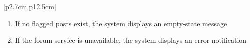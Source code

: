 \begin{table}[H]
\begin{tabular}{|p{2.7cm}|p{12.5cm}|}
\begin{minipage}[t]{\linewidth}
                                      \begin{enumerate}[topsep=0pt,itemsep=1pt,parsep=0pt,partopsep=0pt]
                                          \item If no flagged posts exist, the system displays an empty-state message
                                          \item If the forum service is unavailable, the system displays an error notification
                                      \end{enumerate}
                                  \end{minipage}            \\ \hline
    \end{tabular}
    \label{tab:admin-view-flagged}
\end{table}
